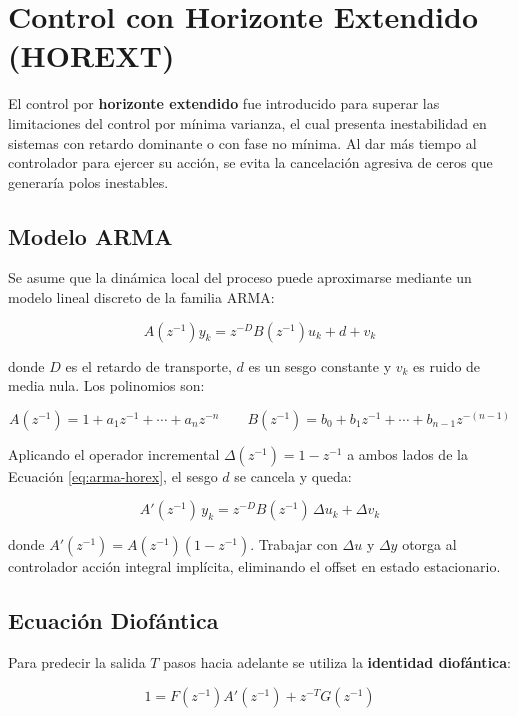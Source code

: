 \clearpage
\section{Control con Horizonte Extendido (HOREXT)}

El control por \textbf{horizonte extendido} fue introducido para superar las limitaciones del control por mínima varianza, el cual presenta inestabilidad en sistemas con retardo dominante o con fase no mínima. Al dar más tiempo al controlador para ejercer su acción, se evita la cancelación agresiva de ceros que generaría polos inestables.

\subsection{Modelo ARMA}

Se asume que la dinámica local del proceso puede aproximarse mediante un modelo lineal discreto de la familia ARMA:

\begin{equation}
  A(z^{-1})y_k = z^{-D}B(z^{-1})u_k + d + v_k
  \label{eq:arma-horex}
\end{equation}

donde $D$ es el retardo de transporte, $d$ es un sesgo constante y $v_k$ es ruido de media nula. Los polinomios son:

\[
  A(z^{-1}) = 1 + a_1z^{-1} + \cdots + a_nz^{-n}
  \qquad
  B(z^{-1}) = b_0 + b_1z^{-1} + \cdots + b_{n-1}z^{-(n-1)}
\]

Aplicando el operador incremental $\Delta(z^{-1}) = 1 - z^{-1}$ a ambos lados de la Ecuación \ref{eq:arma-horex}, el sesgo $d$ se cancela y queda:

\begin{equation}
  A'(z^{-1})\,y_k = z^{-D}B(z^{-1})\,\Delta u_k + \Delta v_k
  \label{eq:arma-delta-horex}
\end{equation}

donde $A'(z^{-1}) = A(z^{-1})(1-z^{-1})$. Trabajar con $\Delta u$ y $\Delta y$ otorga al controlador acción integral implícita, eliminando el offset en estado estacionario.

\subsection{Ecuación Diofántica}

Para predecir la salida $T$ pasos hacia adelante se utiliza la \textbf{identidad diofántica}:

\begin{equation}
  1 = F(z^{-1})A'(z^{-1}) + z^{-T}G(z^{-1})
  \label{eq:diofantica}
\end{equation}

